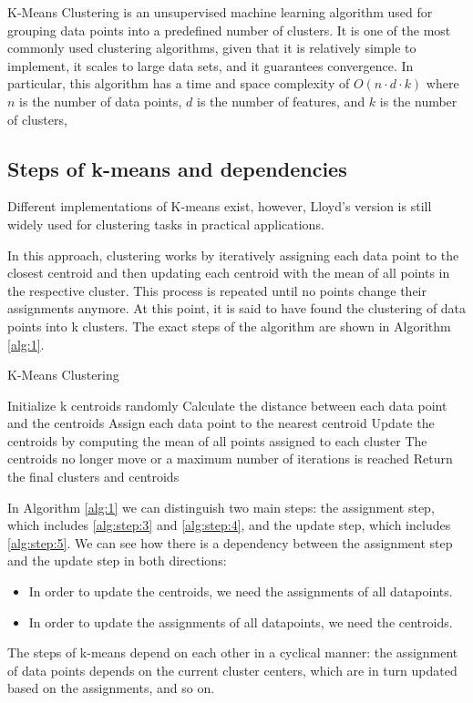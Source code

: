 K-Means Clustering is an unsupervised machine learning algorithm used for grouping data points into a predefined number of clusters. It is one of the most commonly used clustering algorithms, given that it is relatively simple to implement, it scales to large data sets, and it guarantees convergence. In particular, this algorithm has a time and space complexity of $O(n\cdot d\cdot k)$ where $n$ is the number of data points, $d$ is the number of features, and  $k$ is the number of clusters,

\subsection{Steps of k-means and dependencies}

Different implementations of K-means exist, however, Lloyd's version is still widely used for clustering tasks in practical applications.

In this approach, clustering works by iteratively assigning each data point to the closest centroid and then updating each centroid with the mean of all points in the respective cluster. This process is repeated until no points change their assignments anymore. At this point, it is said to have found the clustering of data points into k clusters. The exact steps of the algorithm are shown in Algorithm \ref{alg:1}.

\begin{algorithm}
\caption{K-Means Clustering}
\begin{algorithmic}[1]
    \State Initialize k centroids randomly
    \Repeat
    \State Calculate the distance between each data point and the centroids
    \label{alg:step:3}
    \State Assign each data point to the nearest centroid
    \label{alg:step:4}
    \State Update the centroids by computing the mean of all points assigned to each cluster
    \label{alg:step:5}
    \Until The centroids no longer move or a maximum number of iterations is reached
    \State Return the final clusters and centroids
\end{algorithmic}
\label{alg:1}
\end{algorithm}

In Algorithm \ref{alg:1}  we can distinguish two main steps: the assignment step, which includes \ref{alg:step:3} and \ref{alg:step:4}, and the update step, which includes \ref{alg:step:5}.
We can see how there is a dependency between the assignment step and the update step in both directions:
\begin{itemize}
    \item In order to update the centroids, we need the assignments of all datapoints.
    \item In order to update the assignments of all datapoints, we need the centroids.
\end{itemize}
The steps of k-means depend on each other in a cyclical manner: the assignment of data points depends on the current cluster centers, which are in turn updated based on the assignments, and so on.


